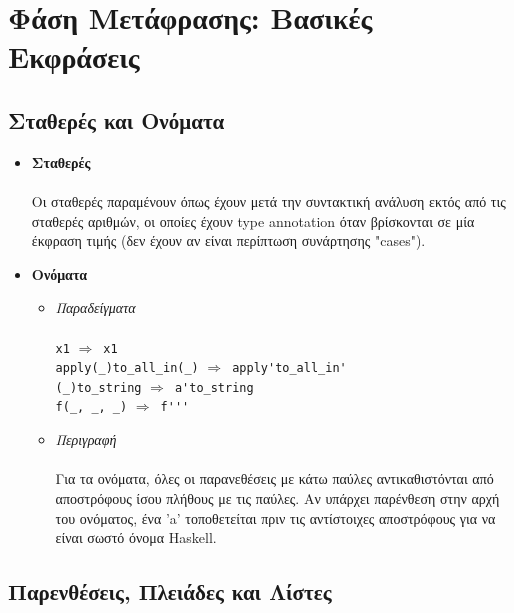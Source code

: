\documentclass[diploma]{softlab-thesis}
\def\H{Haskell}
\def\lra{$\Longrightarrow$\ }
\begin{document}
\section{Φάση Μετάφρασης: Βασικές Εκφράσεις}

\subsection{Σταθερές και Ονόματα}

\begin{itemize}
\item
\textbf{Σταθερές}\\\\
Οι σταθερές παραμένουν όπως έχουν μετά την συντακτική ανάλυση εκτός από τις
σταθερές αριθμών, οι οποίες έχουν type annotation όταν βρίσκονται σε μία
έκφραση τιμής (δεν έχουν αν είναι περίπτωση συνάρτησης "cases").

\item
\textbf{Ονόματα}

\begin{itemize}
\item
\textit{Παραδείγματα}\\\\
\texttt{x1} \lra \texttt{x1} \\
\verb|apply(_)to_all_in(_)| \lra \verb|apply'to_all_in'| \\
\verb|(_)to_string| \lra \verb|a'to_string| \\
\verb|f(_, _, _)| \lra \verb|f'''|\\

\item
\textit{Περιγραφή}\\\\
Για τα ονόματα, όλες οι παρανεθέσεις με κάτω παύλες αντικαθιστόνται από
αποστρόφους ίσου πλήθους με τις παύλες. Αν υπάρχει παρένθεση στην αρχή του
ονόματος, ένα 'a' τοποθετείται πριν τις αντίστοιχες αποστρόφους για να
είναι σωστό όνομα \H.

\end{itemize}

\end{itemize}

\subsection{Παρενθέσεις, Πλειάδες και Λίστες}
\end{document}
